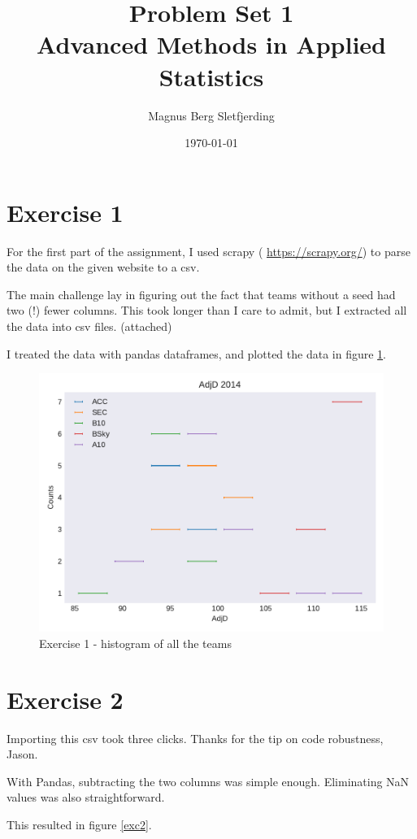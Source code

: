 \documentclass[a4paper,11pt]{article}
\title{Problem Set 1 \\ \Large Advanced Methods in Applied Statistics}
\author{Magnus Berg Sletfjerding}
\date{\today}
\begin{document}
\maketitle

\section{Exercise 1}
For the first part of the assignment, I used scrapy ( \url{https://scrapy.org/}) to parse the data on the given website to a csv.

The main challenge lay in figuring out the fact that teams without a seed had two (!) fewer columns.
This took longer than I care to admit, but I extracted all the data into csv files. (attached)

I treated the data with pandas dataframes, and plotted the data in figure \ref{exc1}.

\begin{figure}[ht!]
  \includegraphics[width=\linewidth]{../plots/Exc1.pdf}
  \caption{Exercise 1 - histogram of all the teams}
  \label{exc1}
\end{figure}


\section{Exercise 2}
Importing this csv took three clicks.
Thanks for the tip on code robustness, Jason.

With Pandas, subtracting the two columns was simple enough.
Eliminating NaN values was also straightforward.

This resulted in figure \ref{exc2}.
\end{document}
